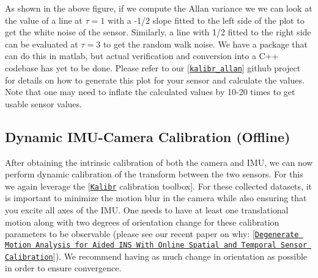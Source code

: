 As shown in the above figure, if we compute the Allan variance we we can look at the value of a line at $\tau=1$ with a -\/1/2 slope fitted to the left side of the plot to get the white noise of the sensor. Similarly, a line with 1/2 fitted to the right side can be evaluated at $\tau=3$ to get the random walk noise. We have a package that can do this in matlab, but actual verification and conversion into a C++ codebase has yet to be done. Please refer to our \mbox{[}\href{https://github.com/rpng/kalibr_allan}{\tt kalibr\+\_\+allan}\mbox{]} github project for details on how to generate this plot for your sensor and calculate the values. Note that one may need to inflate the calculated values by 10-\/20 times to get usable sensor values.\hypertarget{gs-calibration_gs-calib-cam-dynamic}{}\subsection{Dynamic I\+M\+U-\/\+Camera Calibration (\+Offline)}\label{gs-calibration_gs-calib-cam-dynamic}
After obtaining the intrinsic calibration of both the camera and I\+MU, we can now perform dynamic calibration of the transform between the two sensors. For this we again leverage the \mbox{[}\href{https://github.com/ethz-asl/kalibr/}{\tt Kalibr} calibration toolbox\mbox{]}. For these collected datasets, it is important to minimize the motion blur in the camera while also ensuring that you excite all axes of the I\+MU. One needs to have at least one translational motion along with two degrees of orientation change for these calibration parameters to be observable (please see our recent paper on why\+: \mbox{[}\href{https://ieeexplore.ieee.org/abstract/document/8616792}{\tt Degenerate Motion Analysis for Aided I\+NS With Online Spatial and Temporal Sensor Calibration}\mbox{]}). We recommend having as much change in orientation as possible in order to ensure convergence.


